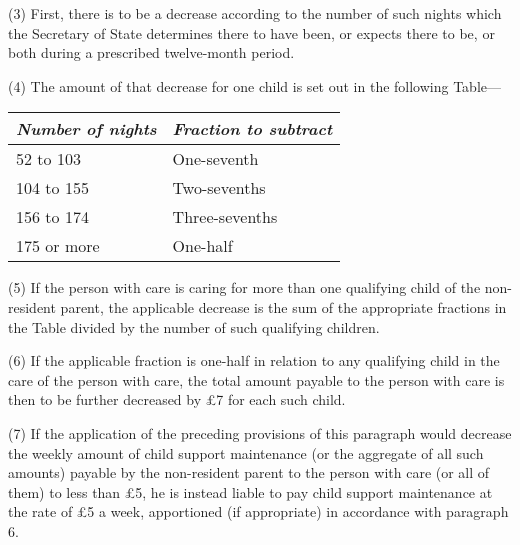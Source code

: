 \documentclass[12pt,a4paper]{article}
\begin{document}
{(3) First, there is to be a decrease according to the number of such nights which the Secretary of State determines there to have been, or expects there to be, or both during a prescribed twelve-month period.

(4) The amount of that decrease for one child is set out in the following Table---

\begin{center}
\begin{tabular}{ll}
\hline
\itshape Number of nights & \itshape Fraction to subtract\\
\hline
52 to 103 &One-seventh\\
104 to 155 &Two-sevenths\\
156 to 174 &Three-sevenths\\
175 or more &One-half\\
\hline
\end{tabular}
\end{center}

(5)
If the person with care is caring for more than one qualifying child of the non-resident parent, the applicable decrease is the sum of the appropriate fractions in the Table divided by the number of such qualifying children.

(6)
If the applicable fraction is one-half in relation to any qualifying child in the care of the person with care, the total amount payable to the person with care is then to be further decreased by £7 for each such child.

(7)
If the application of the preceding provisions of this paragraph would decrease the weekly amount of child support maintenance (or the aggregate of all such amounts) payable by the non-resident parent to the person with care (or all of them) to less than £5, he is instead liable to pay child support maintenance at the rate of £5 a week, apportioned (if appropriate) in accordance with paragraph 6.

}
\end{document}
